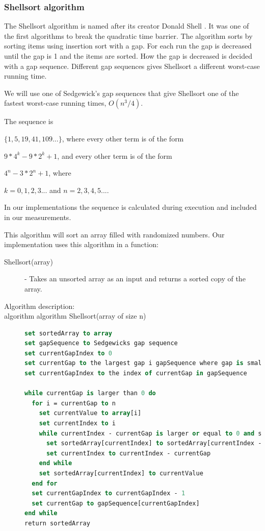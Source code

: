 \documentclass {article}
\begin{document}
\subsubsection{Shellsort algorithm}
The Shellsort algorithm is named after its creator Donald Shell \cite{weiss}. It was one of the first algorithms to break the quadratic time barrier. The algorithm sorts by sorting items using insertion sort with a gap. For each run the gap is decreased until the gap is 1 and the items are sorted. How the gap is decreased is decided with a gap sequence. Different gap sequences gives Shellsort a different worst-case running time.
 
We will use one of Sedgewick's gap sequences that give Shellsort one of the fastest worst-case running times, \(O(n^3/4)\).

The sequence is 

\(\{1, 5, 19, 41, 109...\}\), where every other term is of the form

\(9 * 4^k - 9 * 2^k + 1\), and every other term is of the form

\(4^n - 3 * 2^n + 1\), where 

\(k = {0, 1, 2, 3...}\) and \(n = {2, 3, 4, 5...}\).
 
In our implementations the sequence is calculated during execution and included in our measurements.

This algorithm will sort an array filled with randomized numbers. Our implementation uses this algorithm in a function:

\begin{description}
\item[Shellsort(array)] - Takes an unsorted array as an input and returns a sorted copy of the array. 

\item[Algorithm description:]
\item[algorithm algorithm Shellsort(array of size n)]
\item []
\begin{lstlisting}[language=Pascal]
set sortedArray to array
set gapSequence to Sedgewicks gap sequence
set currentGapIndex to 0
set currentGap to the largest gap i gapSequence where gap is smaller than n divided by 2
set currentGapIndex to the index of currentGap in gapSequence

while currentGap is larger than 0 do
  for i = currentGap to n
    set currentValue to array[i]
    set currentIndex to i
    while currentIndex - currentGap is larger or equal to 0 and sortedArray[currentIndex - currentGap] is larger than currentValue do
      set sortedArray[currentIndex] to sortedArray[currentIndex - currentGap]
      set currentIndex to currentIndex - currentGap
    end while
    set sortedArray[currentIndex] to currentValue
  end for
  set currentGapIndex to currentGapIndex - 1
  set currentGap to gapSequence[currentGapIndex]
end while
return sortedArray
\end{lstlisting}
\end{description}
\end{document}
